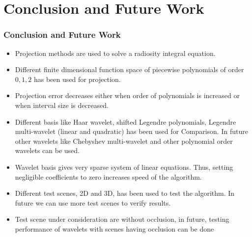\section{Conclusion and Future Work}
\begin{frame}\frametitle{Conclusion and Future Work}
\begin{itemize}
\item Projection methods are used to solve a radiosity integral equation.

\item Different finite dimensional function space of piecewise polynomials of order $0,1,2$ has been used for projection.
\item Projection error decreases either when order of polynomials is increased or when interval size is decreased.
\item Different basis like Haar wavelet, shifted Legendre polynomials, Legendre multi-wavelet (linear and quadratic) has been used for Comparison. In future other wavelets like Chebyshev multi-wavelet and other polynomial order wavelets can be used. 
\item Wavelet basis gives very sparse system of linear equations. Thus, setting negligible coefficients to zero increases speed of the algorithm.


\end{itemize}
\end{frame}
\begin{frame}
\begin{itemize}

\item Different test scenes, 2D and 3D, has been used to test the algorithm. In future we can use more test scenes to verify results.

\item Test scene under consideration are without occlusion, in future, testing performance of wavelets with scenes having occlusion  can be done 

\end{itemize}
\end{frame}




